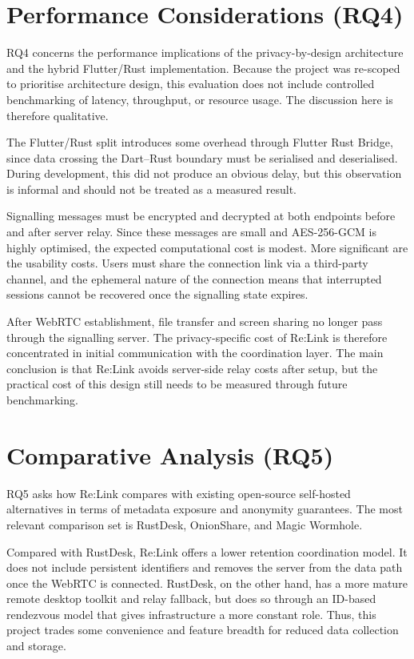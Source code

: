\documentclass[12pt,a4paper,oneside]{report}
\begin{document}
\section{Performance Considerations (RQ4)}
\label{sec:rq4}

RQ4 concerns the performance implications of the privacy-by-design architecture and the hybrid Flutter/Rust implementation. Because the project was re-scoped to prioritise architecture design, this evaluation does not include controlled benchmarking of latency, throughput, or resource usage. The discussion here is therefore qualitative.

The Flutter/Rust split introduces some overhead through Flutter Rust Bridge, since data crossing the Dart--Rust boundary must be serialised and deserialised. During development, this did not produce an obvious delay, but this observation is informal and should not be treated as a measured result.

Signalling messages must be encrypted and decrypted at both endpoints before and after server relay. Since these messages are small and AES-256-GCM is highly optimised, the expected computational cost is modest. More significant are the usability costs. Users must share the connection link via a third-party channel, and the ephemeral nature of the connection means that interrupted sessions cannot be recovered once the signalling state expires.

After WebRTC establishment, file transfer and screen sharing no longer pass through the signalling server. The privacy-specific cost of Re:Link is therefore concentrated in initial communication with the coordination layer. The main conclusion is that Re:Link avoids server-side relay costs after setup, but the practical cost of this design still needs to be measured through future benchmarking.


\section{Comparative Analysis (RQ5)}
\label{sec:rq5}

RQ5 asks how Re:Link compares with existing open-source self-hosted alternatives in terms of metadata exposure and anonymity guarantees. The most relevant comparison set is RustDesk, OnionShare, and Magic Wormhole.

Compared with RustDesk, Re:Link offers a lower retention coordination model. It does not include persistent identifiers and removes the server from the data path once the WebRTC is connected. RustDesk, on the other hand, has a more mature remote desktop toolkit and relay fallback, but does so through an ID-based rendezvous model that gives infrastructure a more constant role. Thus, this project trades some convenience and feature breadth for reduced data collection and storage.
\end{document}
